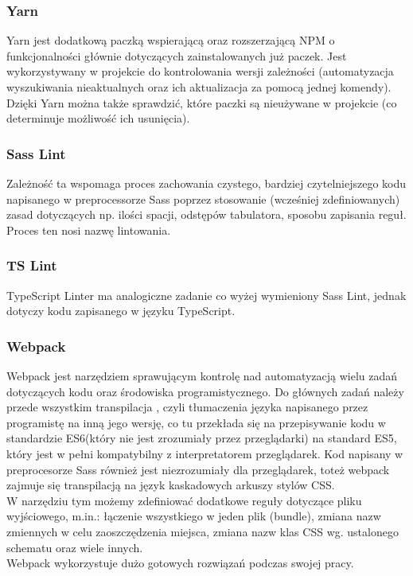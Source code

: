 \documentclass[eng,printmode]{mgr}
\begin{document}
\subsubsection{Yarn}
Yarn \cite{Yarn} jest dodatkową paczką wspierającą oraz rozszerzającą NPM o funkcjonalności głównie dotyczących  zainstalowanych już paczek. Jest wykorzystywany w projekcie do kontrolowania wersji zależności (automatyzacja wyszukiwania nieaktualnych oraz ich aktualizacja za pomocą jednej komendy). Dzięki Yarn można także sprawdzić, które paczki są nieużywane w projekcie (co determinuje możliwość ich usunięcia).

\subsubsection{Sass Lint}
Zależność ta \cite{SassLint} wspomaga proces zachowania czystego, bardziej czytelniejszego kodu napisanego w preprocessorze  Sass poprzez stosowanie (wcześniej zdefiniowanych) zasad dotyczących np. ilości spacji, odstępów tabulatora, sposobu zapisania reguł. Proces ten nosi nazwę lintowania.

\subsubsection{TS Lint}
TypeScript Linter \cite{TSLint} ma analogiczne zadanie co wyżej wymieniony Sass Lint, jednak dotyczy kodu zapisanego w języku TypeScript.

\subsubsection{Webpack}
Webpack \cite{Webpack} jest narzędziem sprawującym kontrolę nad automatyzacją wielu zadań dotyczących kodu oraz środowiska programistycznego. Do głównych zadań należy przede wszystkim transpilacja \cite{Keyword_Transpile}, czyli tłumaczenia języka napisanego przez programistę na inną jego wersję, co tu przekłada się na przepisywanie kodu w standardzie ES6(który nie jest zrozumiały przez przeglądarki) na standard ES5, który jest w pełni kompatybilny z interpretatorem przeglądarek. Kod napisany w preprocesorze Sass również jest niezrozumiały dla przeglądarek, toteż webpack zajmuje się transpilacją na język kaskadowych arkuszy stylów CSS.
\\
W narzędziu tym możemy zdefiniować dodatkowe reguły dotyczące pliku wyjściowego, m.in.: łączenie wszystkiego w jeden plik (bundle), zmiana nazw zmiennych w celu zaoszczędzenia miejsca, zmiana nazw klas CSS wg. ustalonego schematu oraz wiele innych. 
\\
Webpack wykorzystuje dużo gotowych rozwiązań podczas swojej pracy.
\end{document}
